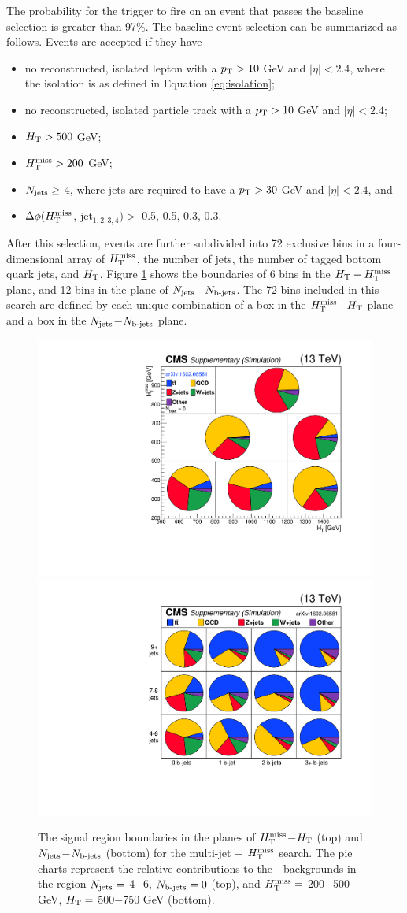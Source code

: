The probability for the trigger to fire on an event that passes the baseline selection is greater than 97\%. The baseline event selection can be summarized as follows. Events are accepted if they have
\begin{itemize}
\item no reconstructed, isolated lepton with a $p_{\text{T}}>10$ GeV and $|\eta|<2.4$, where the isolation is as defined in Equation \ref{eq:isolation};
\item no reconstructed, isolated particle track with a $p_{\text{T}}>10$ GeV and $|\eta|<2.4$;
\item $H_{\rm T}>500$ GeV;
\item $H_{\text{T}}^{\rm miss}>200$ GeV;
\item $N_{\rm jets}\geq$ 4, where jets are required to have a $p_{\text{T}}>30$ GeV and $|\eta|<2.4$, and
\item $\Delta\phi(H_{\text{T}}^{\rm miss}$, jet$_{1,2,3,4})>$ 0.5, 0.5, 0.3, 0.3.
\end{itemize}
After this selection, events are further subdivided into 72 exclusive bins
in a four-dimensional array of $H_{\text{T}}^{\rm miss}$,
the number of jets,
the number of tagged bottom quark jets,
and $H_{\rm T}$. Figure \ref{fig:ra2bArray} shows the boundaries of 6 bins in the $H_{\rm T}-H_{\text{T}}^{\rm miss}$ plane, and 12 bins in the plane of $N_{\rm jets}$$-$$N_{\text{b-jets}}$. The 72 bins included in this search are defined by each unique combination of a box in the $H_{\text{T}}^{\rm miss}$$-$$H_{\rm T}$ plane and a box in the $N_{\rm jets}$$-$$N_{\text{b-jets}}$ plane. 
\begin{figure}[tb!]
\centering
\includegraphics[height=0.442\textwidth]{figures/SusySearches/Ra2b2015/aux/MC_BG_Pie_NB0.pdf}
\hspace{-1cm}
\includegraphics[height=0.445\textwidth]{figures/SusySearches/Ra2b2015/aux/MC_BG_Pie_vs_NJets_NBJets.pdf}
\caption{The signal region boundaries in the planes of $H_{\text{T}}^{\rm miss}$$-$$H_{\rm T}$ (top) and $N_{\rm jets}$$-$$N_{\text{b-jets}}$ (bottom) for the multi-jet $+$ $H_{\text{T}}^{\rm miss}$ 
search. The pie charts represent the relative contributions
 to the~\sm~backgrounds in the region $N_{\rm jets}=$ 4$-$6, $N_{\text{b-jets}}=0$ (top), and $H_{\text{T}}^{\rm miss}=$ 200$-$500 GeV, $H_{\rm T}=$ 500$-$750 GeV (bottom).}
\label{fig:ra2bArray}
\end{figure}


